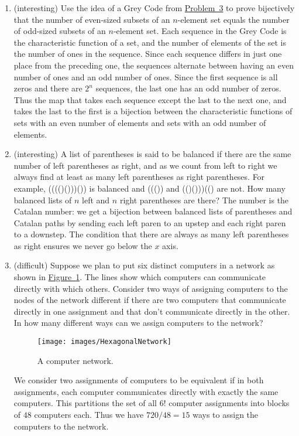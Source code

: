\documentclass[10pt,]{book}
\theoremstyle{plain}
\theoremstyle{definition}
\numberwithin{equation}{chapter}
\begin{document}
\begin{enumerate}
%
\item\hypertarget{li-12}{}(interesting) Use the idea of a Grey Code from \hyperlink{GreyCode}{Problem~3} to prove bijectively that the number of even-sized subsets of an \(n\)-element set equals the number of odd-sized subsets of an \(n\)-element set. Each sequence in the Grey Code is the characteristic function of a set, and the number of elements of the set is the number of ones in the sequence. Since each sequence differs in just one place from the preceding one, the sequences alternate between having an even number of ones and an odd number of ones. Since the first sequence is all zeros and there are \(2^n\) sequences, the last one has an odd number of zeros. Thus the map that takes each sequence except the last to the next one, and takes the last to the first is a bijection between the characteristic functions of sets with an even number of elements and sets with an odd number of elements.%
%
\item\hypertarget{li-13}{}(interesting) A list of parentheses is said to be balanced if there are the same number of left parentheses as right, and as we count from left to right we always find at least as many left parentheses as right parentheses.  For example, (((()()))()) is balanced and ((()) and (()()))(() are not.  How many balanced lists of \(n\) left and \(n\)  right parentheses are there? The number is the Catalan number: we get a bijection between balanced lists of parentheses and Catalan paths by sending each left paren to an upstep and each right paren to a downstep. The condition that there are always as many left parentheses as right ensures we never go below the \(x\) axis.%
%
\item\hypertarget{li-14}{}(difficult) Suppose we plan to put six distinct computers in a network as shown in \hyperref[hexagonalnetwork]{Figure~\ref{hexagonalnetwork}}.  The lines show which computers can communicate directly with which others.  Consider two ways of assigning computers to the nodes of the network different if there are two computers that communicate directly in one assignment and that don't communicate directly in the other.  In how many different ways can we assign computers to the network? \begin{figure}
\centering
\texttt{[image: images/HexagonalNetwork]}
\caption{A computer network.\label{hexagonalnetwork}}
\end{figure}
 We consider two assignments of computers to be equivalent if in both assignments, each computer communicates directly with exactly the same computers. This partitions the set of all \(6!\) computer assignments into blocks of \(48\) computers each. Thus we have \(720/48=15\) ways to assign the computers to the network.%

\end{enumerate}
\end{document}
